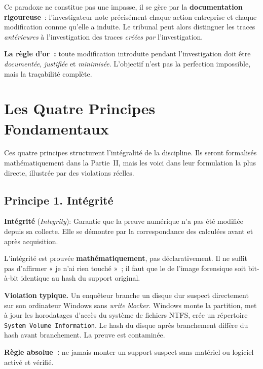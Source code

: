 Ce paradoxe ne constitue pas une impasse, il se gère par la
\textbf{documentation rigoureuse}~: l'investigateur note précisément chaque
action entreprise et chaque modification connue qu'elle a induite. Le tribunal
peut alors distinguer les traces \emph{antérieures} à l'investigation des
traces \emph{créées par} l'investigation.

\begin{boxinfo}
\textbf{La règle d'or~:} toute modification introduite pendant l'investigation
doit être \emph{documentée}, \emph{justifiée} et \emph{minimisée}. L'objectif
n'est pas la perfection impossible, mais la traçabilité complète.
\end{boxinfo}

\section{Les Quatre Principes Fondamentaux}

Ces quatre principes structurent l'intégralité de la discipline. Ils seront
formalisés mathématiquement dans la Partie~II, mais les voici dans leur
formulation la plus directe, illustrée par des violations réelles.

\subsection{Principe 1. Intégrité}
\label{subsec:principe-integrite}

\begin{boxdef}
\textbf{Intégrité} (\textit{Integrity}):
Garantie que la preuve numérique n'a pas été modifiée depuis sa collecte.
Elle se démontre par la correspondance des  calculées avant et après acquisition.
\end{boxdef}

L'intégrité est prouvée \textbf{mathématiquement}, pas déclarativement.
Il ne suffit pas d'affirmer « je n'ai rien touché »~; il faut que le
 de l'image forensique soit bit-à-bit identique au hash du
support original.

\begin{boxalert}
\textbf{Violation typique.} Un enquêteur branche un disque dur suspect
directement sur son ordinateur Windows sans \textit{write blocker}. Windows
monte la partition, met à jour les horodatages d'accès du système de fichiers
NTFS, crée un répertoire \texttt{System Volume Information}. Le hash du disque
après branchement diffère du hash avant branchement. La preuve est contaminée.

\smallskip
\textbf{Règle absolue~:} ne jamais monter un support suspect sans
 matériel ou logiciel activé et vérifié.
\end{boxalert}

